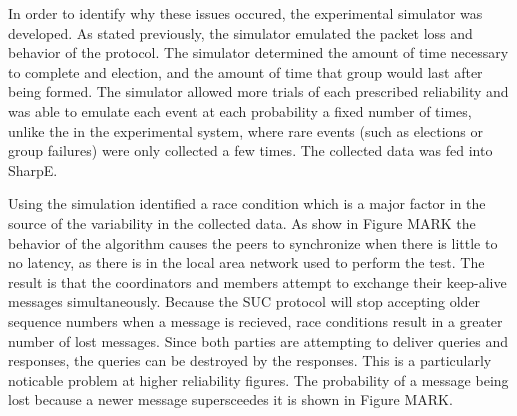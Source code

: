 In order to identify why these issues occured, the experimental simulator was
developed. As stated previously, the simulator emulated the packet loss and
behavior of the protocol. The simulator determined the amount of time necessary
to complete and election, and the amount of time that group would last after
being formed. The simulator allowed more trials of each prescribed reliability
and was able to emulate each event at each probability a fixed number of times,
unlike the in the experimental system, where rare events (such as elections
or group failures) were only collected a few times. The collected data was fed
into SharpE.

Using the simulation identified a race condition which is a major factor in the
source of the variability in the collected data. As show in Figure MARK the 
behavior of the algorithm causes the peers to synchronize when there is little
to no latency, as there is in the local area network used to perform the test.
The result is that the coordinators and members attempt to exchange their
keep-alive messages simultaneously. Because the SUC protocol will stop accepting
older sequence numbers when a message is recieved, race conditions result in
a greater number of lost messages. Since both parties are attempting to
deliver queries and responses, the queries can be destroyed by the responses.
This is a particularly noticable problem at higher reliability figures. The
probability of a message being lost because a newer message supersceedes it
is shown in Figure MARK.


